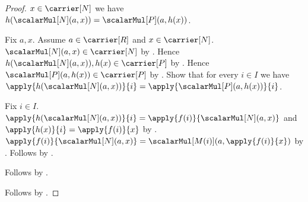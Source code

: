 \begin{proof}
        $x\in\carrier[N]$ we have
        $h(\scalarMul[N](a,x))=\scalarMul[P](a,h(x))$.
    \begin{subproof}
        Fix $a,x$.
        Assume $a\in\carrier[R]$ and $x\in\carrier[N]$.
        $\scalarMul[N](a,x)\in\carrier[N]$ by
            .
        Hence $h(\scalarMul[N](a,x)),h(x)\in\carrier[P]$ by
            .
        Hence $\scalarMul[P](a,h(x))\in\carrier[P]$ by
            .
        Show that for every $i\in I$ we have
            $\apply{h(\scalarMul[N](a,x))}{i}
                =\apply{\scalarMul[P](a,h(x))}{i}$.
        \begin{subproof}
            Fix $i\in I$.
            $\apply{h(\scalarMul[N](a,x))}{i}
                =\apply{f(i)}{\scalarMul[N](a,x)}$ and
                $\apply{h(x)}{i}=\apply{f(i)}{x}$ by
                .
            $\apply{f(i)}{\scalarMul[N](a,x)}
                =\scalarMul[M(i)](a,\apply{f(i)}{x})$ by
                .
            Follows by .
        \end{subproof}
        Follows by .
    \end{subproof}
    Follows by .
\end{proof}

